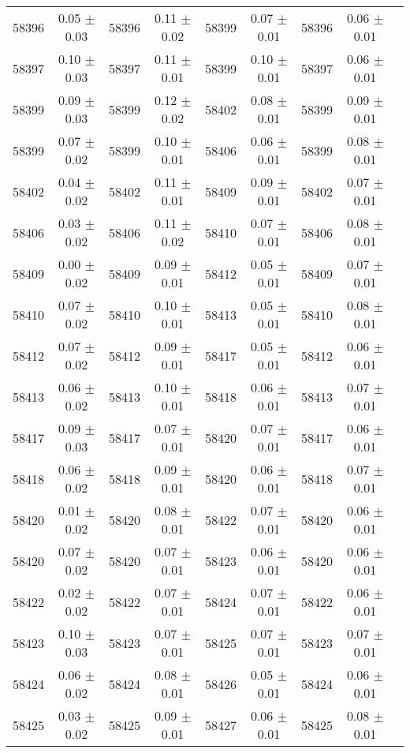 \begin{center}
\begin{longtable}{ccccccccc}
58396 & 0.05 $\pm$ 0.03 & 58396 & 0.11 $\pm$ 0.02 & 58399 & 0.07 $\pm$ 0.01 & 58396 & 0.06 $\pm$ 0.01 & \\
58397 & 0.10 $\pm$ 0.03 & 58397 & 0.11 $\pm$ 0.01 & 58399 & 0.10 $\pm$ 0.01 & 58397 & 0.06 $\pm$ 0.01 & \\
58399 & 0.09 $\pm$ 0.03 & 58399 & 0.12 $\pm$ 0.02 & 58402 & 0.08 $\pm$ 0.01 & 58399 & 0.09 $\pm$ 0.01 & \\
58399 & 0.07 $\pm$ 0.02 & 58399 & 0.10 $\pm$ 0.01 & 58406 & 0.06 $\pm$ 0.01 & 58399 & 0.08 $\pm$ 0.01 & \\
58402 & 0.04 $\pm$ 0.02 & 58402 & 0.11 $\pm$ 0.01 & 58409 & 0.09 $\pm$ 0.01 & 58402 & 0.07 $\pm$ 0.01 & \\
58406 & 0.03 $\pm$ 0.02 & 58406 & 0.11 $\pm$ 0.02 & 58410 & 0.07 $\pm$ 0.01 & 58406 & 0.08 $\pm$ 0.01 & \\
58409 & 0.00 $\pm$ 0.02 & 58409 & 0.09 $\pm$ 0.01 & 58412 & 0.05 $\pm$ 0.01 & 58409 & 0.07 $\pm$ 0.01 & \\
58410 & 0.07 $\pm$ 0.02 & 58410 & 0.10 $\pm$ 0.01 & 58413 & 0.05 $\pm$ 0.01 & 58410 & 0.08 $\pm$ 0.01 & \\
58412 & 0.07 $\pm$ 0.02 & 58412 & 0.09 $\pm$ 0.01 & 58417 & 0.05 $\pm$ 0.01 & 58412 & 0.06 $\pm$ 0.01 & \\
58413 & 0.06 $\pm$ 0.02 & 58413 & 0.10 $\pm$ 0.01 & 58418 & 0.06 $\pm$ 0.01 & 58413 & 0.07 $\pm$ 0.01 & \\
58417 & 0.09 $\pm$ 0.03 & 58417 & 0.07 $\pm$ 0.01 & 58420 & 0.07 $\pm$ 0.01 & 58417 & 0.06 $\pm$ 0.01 & \\
58418 & 0.06 $\pm$ 0.02 & 58418 & 0.09 $\pm$ 0.01 & 58420 & 0.06 $\pm$ 0.01 & 58418 & 0.07 $\pm$ 0.01 & \\
58420 & 0.01 $\pm$ 0.02 & 58420 & 0.08 $\pm$ 0.01 & 58422 & 0.07 $\pm$ 0.01 & 58420 & 0.06 $\pm$ 0.01 & \\
58420 & 0.07 $\pm$ 0.02 & 58420 & 0.07 $\pm$ 0.01 & 58423 & 0.06 $\pm$ 0.01 & 58420 & 0.06 $\pm$ 0.01 & \\
58422 & 0.02 $\pm$ 0.02 & 58422 & 0.07 $\pm$ 0.01 & 58424 & 0.07 $\pm$ 0.01 & 58422 & 0.06 $\pm$ 0.01 & \\
58423 & 0.10 $\pm$ 0.03 & 58423 & 0.07 $\pm$ 0.01 & 58425 & 0.07 $\pm$ 0.01 & 58423 & 0.07 $\pm$ 0.01 & \\
58424 & 0.06 $\pm$ 0.02 & 58424 & 0.08 $\pm$ 0.01 & 58426 & 0.05 $\pm$ 0.01 & 58424 & 0.06 $\pm$ 0.01 & \\
58425 & 0.03 $\pm$ 0.02 & 58425 & 0.09 $\pm$ 0.01 & 58427 & 0.06 $\pm$ 0.01 & 58425 & 0.08 $\pm$ 0.01 & \\

\end{longtable}
\end{center}
